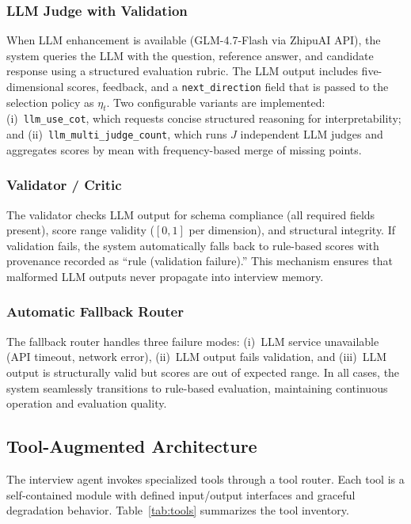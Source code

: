 ﻿\documentclass[final,3p,times,authoryear]{elsarticle}
\begin{document}
\subsubsection{LLM Judge with Validation}

\noindent When LLM enhancement is available (GLM-4.7-Flash via ZhipuAI API), the system queries the LLM with the question, reference answer, and candidate response using a structured evaluation rubric. The LLM output includes five-dimensional scores, feedback, and a \texttt{next\_direction} field that is passed to the selection policy as $\eta_t$. Two configurable variants are implemented: (i)~\texttt{llm\_use\_cot}, which requests concise structured reasoning for interpretability; and (ii)~\texttt{llm\_multi\_judge\_count}, which runs $J$ independent LLM judges and aggregates scores by mean with frequency-based merge of missing points.

\subsubsection{Validator / Critic}

\noindent The validator checks LLM output for schema compliance (all required fields present), score range validity ($[0,1]$ per dimension), and structural integrity. If validation fails, the system automatically falls back to rule-based scores with provenance recorded as ``rule (validation failure).'' This mechanism ensures that malformed LLM outputs never propagate into interview memory.

\subsubsection{Automatic Fallback Router}

\noindent The fallback router handles three failure modes: (i)~LLM service unavailable (API timeout, network error), (ii)~LLM output fails validation, and (iii)~LLM output is structurally valid but scores are out of expected range. In all cases, the system seamlessly transitions to rule-based evaluation, maintaining continuous operation and evaluation quality.

\subsection{Tool-Augmented Architecture}
\label{sec:tools}

\noindent The interview agent invokes specialized tools through a tool router. Each tool is a self-contained module with defined input/output interfaces and graceful degradation behavior. Table~\ref{tab:tools} summarizes the tool inventory.
\end{document}
